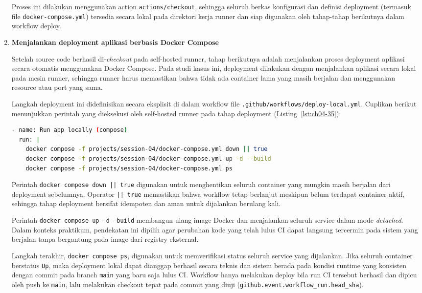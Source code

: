 \begin{enumerate}
Proses ini dilakukan menggunakan action \texttt{actions/checkout}, sehingga
seluruh berkas konfigurasi dan definisi deployment (termasuk file
\texttt{docker-compose.yml}) tersedia secara lokal pada direktori kerja runner
dan siap digunakan oleh tahap-tahap berikutnya dalam workflow deploy.

  
\item \textbf{Menjalankan deployment aplikasi berbasis Docker Compose}

Setelah source code berhasil di-\textit{checkout} pada self-hosted runner,
tahap berikutnya adalah menjalankan proses deployment aplikasi secara otomatis
menggunakan Docker Compose. Pada studi kasus ini, deployment dilakukan dengan
menjalankan aplikasi secara lokal pada mesin runner, sehingga runner harus
memastikan bahwa tidak ada container lama yang masih berjalan dan menggunakan
resource atau port yang sama.

Langkah deployment ini didefinisikan secara eksplisit di dalam workflow file
\texttt{.github/workflows/deploy-local.yml}. Cuplikan berikut menunjukkan perintah yang
dieksekusi oleh self-hosted runner pada tahap deployment (Listing~\ref{lst:ch04-35}):

\begin{lstlisting}[language=bash, caption={Potongan kode pada Tutorial (5)}, label={lst:ch04-35}]
- name: Run app locally (compose)
  run: |
    docker compose -f projects/session-04/docker-compose.yml down || true
    docker compose -f projects/session-04/docker-compose.yml up -d --build
    docker compose -f projects/session-04/docker-compose.yml ps
\end{lstlisting}

Perintah \texttt{docker compose down || true} digunakan untuk menghentikan
seluruh container yang mungkin masih berjalan dari deployment sebelumnya.
Operator \texttt{|| true} memastikan bahwa workflow tetap berlanjut meskipun
belum terdapat container aktif, sehingga tahap deployment bersifat idempoten
dan aman untuk dijalankan berulang kali.

Perintah \texttt{docker compose up -d --build} membangun ulang image Docker dan
menjalankan seluruh service dalam mode \textit{detached}. Dalam konteks
praktikum, pendekatan ini dipilih agar perubahan kode yang telah lulus CI dapat
langsung tercermin pada sistem yang berjalan tanpa bergantung pada image dari
registry eksternal.

Langkah terakhir, \texttt{docker compose ps}, digunakan untuk memverifikasi
status seluruh service yang dijalankan. Jika seluruh container berstatus
\texttt{Up}, maka deployment lokal dapat dianggap berhasil secara teknis dan
sistem berada pada kondisi runtime yang konsisten dengan commit pada
branch \texttt{main} yang baru saja lulus CI. Workflow hanya melakukan deploy
bila run CI tersebut berhasil dan dipicu oleh push ke \texttt{main}, lalu
melakukan checkout tepat pada commit yang diuji
(\texttt{github.event.workflow\_run.head\_sha}).

\end{enumerate}


